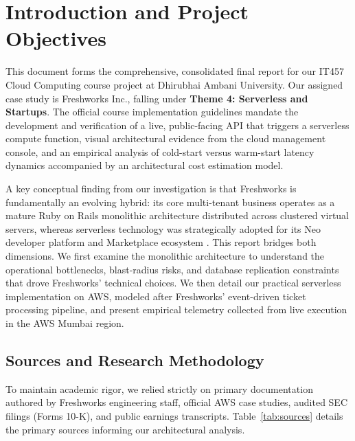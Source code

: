 \documentclass[10pt,a4paper]{article}
\begin{document}
\section{Introduction and Project Objectives}
This document forms the comprehensive, consolidated final report for our IT457 Cloud Computing course project at Dhirubhai Ambani University. Our assigned case study is Freshworks Inc., falling under \textbf{Theme 4: Serverless and Startups}. The official course implementation guidelines mandate the development and verification of a live, public-facing API that triggers a serverless compute function, visual architectural evidence from the cloud management console, and an empirical analysis of cold-start versus warm-start latency dynamics accompanied by an architectural cost estimation model.

A key conceptual finding from our investigation is that Freshworks is fundamentally an evolving hybrid: its core multi-tenant business operates as a mature Ruby on Rails monolithic architecture distributed across clustered virtual servers, whereas serverless technology was strategically adopted for its Neo developer platform and Marketplace ecosystem \cite{fw_scale_2020, aws_freshworks_lambda}. This report bridges both dimensions. We first examine the monolithic architecture to understand the operational bottlenecks, blast-radius risks, and database replication constraints that drove Freshworks' technical choices. We then detail our practical serverless implementation on AWS, modeled after Freshworks' event-driven ticket processing pipeline, and present empirical telemetry collected from live execution in the AWS Mumbai region.

\subsection{Sources and Research Methodology}
To maintain academic rigor, we relied strictly on primary documentation authored by Freshworks engineering staff, official AWS case studies, audited SEC filings (Forms 10-K), and public earnings transcripts. Table~\ref{tab:sources} details the primary sources informing our architectural analysis.
\end{document}
